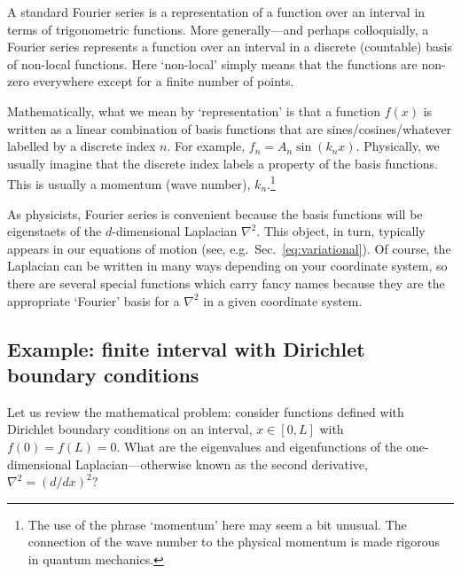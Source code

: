 \documentclass[12pt, oneside]{report}    %
\begin{document}
A standard Fourier series is a representation of a function over an interval in terms of trigonometric functions. More generally---and perhaps colloquially, a Fourier series represents a function over an interval in a discrete (countable) basis of non-local functions. Here `non-local' simply means that the functions are non-zero everywhere except for a finite number of points. 

Mathematically, what we mean by `representation' is that a function $f(x)$ is written as a linear combination of basis functions that are sines/cosines/whatever labelled by a discrete index $n$. For example, $f_n = A_n \sin(k_n x)$. Physically, we usually imagine that the discrete index labels a property of the basis functions. This is usually a momentum (wave number), $k_n$.\footnote{The use of the phrase `momentum' here may seem a bit unusual. The connection of the wave number to the physical momentum is made rigorous in quantum mechanics.} 

As physicists, Fourier series is convenient because the basis functions will be eigenstaets of the $d$-dimensional Laplacian $\nabla^2$. This object, in turn, typically appears in our equations of motion (see, e.g.\ Sec.~\ref{eq:variational}). Of course, the Laplacian can be written in many ways depending on your coordinate system, so there are several special functions which carry fancy names because they are the appropriate `Fourier' basis for a $\nabla^2$ in a given coordinate system. 

\subsection{Example: finite interval with Dirichlet boundary conditions}

Let us review the mathematical problem: consider functions defined with Dirichlet boundary conditions on an interval, $x\in[0,L]$ with $f(0)=f(L)=0$. What are the eigenvalues and eigenfunctions of the one-dimensional Laplacian---otherwise known as the second derivative, $\nabla^2 = (d/dx)^2$?
\end{document}
